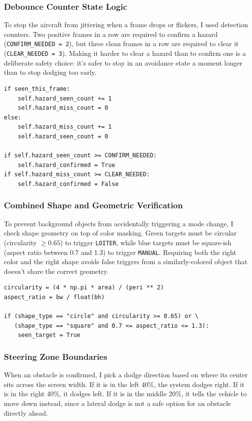 \documentclass[12pt,a4paper]{article}
\begin{document}
\subsubsection{Debounce Counter State Logic}
To stop the aircraft from jittering when a frame drops or flickers, I
used detection counters. Two positive frames in a row are required to
confirm a hazard (\texttt{CONFIRM\_NEEDED = 2}), but three clean frames
in a row are required to clear it (\texttt{CLEAR\_NEEDED = 3}). Making
it harder to clear a hazard than to confirm one is a deliberate safety
choice: it's safer to stay in an avoidance state a moment longer than
to stop dodging too early.

\begin{lstlisting}[style=pythonstyle, caption={Asymmetric debounce counters to confirm and clear hazards.}]
if seen_this_frame:
    self.hazard_seen_count += 1
    self.hazard_miss_count = 0
else:
    self.hazard_miss_count += 1
    self.hazard_seen_count = 0

if self.hazard_seen_count >= CONFIRM_NEEDED:
    self.hazard_confirmed = True
if self.hazard_miss_count >= CLEAR_NEEDED:
    self.hazard_confirmed = False
\end{lstlisting}

\subsubsection{Combined Shape and Geometric Verification}
To prevent background objects from accidentally triggering a mode
change, I check shape geometry on top of color masking. Green targets
must be circular (circularity $\ge 0.65$) to trigger \texttt{LOITER},
while blue targets must be square-ish (aspect ratio between 0.7 and
1.3) to trigger \texttt{MANUAL}. Requiring both the right color and the
right shape avoids false triggers from a similarly-colored object that
doesn't share the correct geometry.

\begin{lstlisting}[style=pythonstyle, caption={Shape verification for Green Circle (LOITER) and Blue Square (MANUAL).}]
circularity = (4 * np.pi * area) / (peri ** 2)
aspect_ratio = bw / float(bh)

if (shape_type == "circle" and circularity >= 0.65) or \
   (shape_type == "square" and 0.7 <= aspect_ratio <= 1.3):
    seen_target = True
\end{lstlisting}

\subsubsection{Steering Zone Boundaries}
When an obstacle is confirmed, I pick a dodge direction based on where
its center sits across the screen width. If it is in the left 40\%, the
system dodges right. If it is in the right 40\%, it dodges left. If it
is in the middle 20\%, it tells the vehicle to move down instead, since
a lateral dodge is not a safe option for an obstacle directly ahead.
\end{document}
